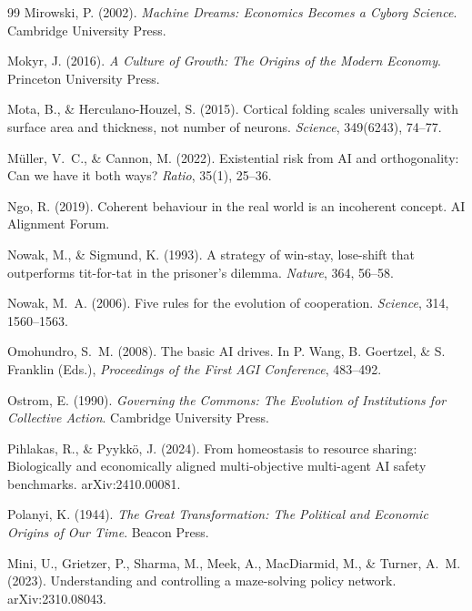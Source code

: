 \documentclass[11pt,a4paper,twocolumn]{article}
\begin{document}
\begin{thebibliography}{99}
 Mirowski, P. (2002). \textit{Machine Dreams: Economics Becomes a Cyborg Science}. Cambridge University Press.

 Mokyr, J. (2016). \textit{A Culture of Growth: The Origins of the Modern Economy}. Princeton University Press.

 Mota, B., \& Herculano-Houzel, S. (2015). Cortical folding scales universally with surface area and thickness, not number of neurons. \textit{Science}, 349(6243), 74--77.

 M\"uller, V.~C., \& Cannon, M. (2022). Existential risk from AI and orthogonality: Can we have it both ways? \textit{Ratio}, 35(1), 25--36.

 Ngo, R. (2019). Coherent behaviour in the real world is an incoherent concept. AI Alignment Forum.

 Nowak, M., \& Sigmund, K. (1993). A strategy of win-stay, lose-shift that outperforms tit-for-tat in the prisoner's dilemma. \textit{Nature}, 364, 56--58.

 Nowak, M.~A. (2006). Five rules for the evolution of cooperation. \textit{Science}, 314, 1560--1563.

 Omohundro, S.~M. (2008). The basic AI drives. In P. Wang, B. Goertzel, \& S. Franklin (Eds.), \textit{Proceedings of the First AGI Conference}, 483--492.

 Ostrom, E. (1990). \textit{Governing the Commons: The Evolution of Institutions for Collective Action}. Cambridge University Press.

 Pihlakas, R., \& Pyykk\"o, J. (2024). From homeostasis to resource sharing: Biologically and economically aligned multi-objective multi-agent AI safety benchmarks. arXiv:2410.00081.

 Polanyi, K. (1944). \textit{The Great Transformation: The Political and Economic Origins of Our Time}. Beacon Press.

 Mini, U., Grietzer, P., Sharma, M., Meek, A., MacDiarmid, M., \& Turner, A.~M. (2023). Understanding and controlling a maze-solving policy network. arXiv:2310.08043.


\end{thebibliography}
\end{document}
